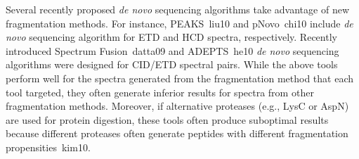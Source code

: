 Several recently proposed {\em de novo} sequencing algorithms take advantage of new fragmentation methods. For instance, PEAKS~\cite{unv}{liu10} and 
pNovo~\cite{unv}{chi10} include {\em de novo} sequencing algorithm for ETD and HCD spectra, respectively. 
Recently introduced Spectrum Fusion~\cite{unv}{datta09} and ADEPTS~\cite{unv}{he10}  {\em de novo} sequencing algorithms were designed for CID/ETD spectral pairs. 
%
While the above tools perform well for the spectra generated from the fragmentation method that each tool targeted, they often generate inferior results for  spectra from other fragmentation methods. Moreover, if alternative proteases (e.g., LysC or AspN) are used for protein digestion, these tools often produce suboptimal results because different proteases often generate peptides with different fragmentation propensities~\cite{unv}{kim10}. 




